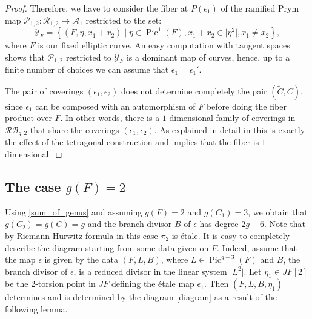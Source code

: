 \documentclass[preprint,12pt]{amsart}
\def\cA{\ensuremath{\mathcal{A}}}
\def\cP{\ensuremath{\mathcal{P}}}
\def\cR{\ensuremath{\mathcal{R}}}
\def\cY{\ensuremath{\mathcal{Y}}}
\def\tC{\ensuremath{\tilde{C}}}
\DeclareMathOperator{\Pic}{Pic}
\newcommand{\set}[1]{\left\{#1\right\}}
\theoremstyle{plain}
\theoremstyle{definition}
\begin{document}
\begin{proof}
Therefore, we have to consider the fiber at $P(\epsilon_1)$ of the ramified Prym map $\cP_{1,2}:\cR_{1,2}\rightarrow \cA_1$ restricted to the set: 
\[\cY_F=\set{(F,\eta, x_1+x_2) \mid \eta \in \Pic^1(F), x_1+x_2 \in \vert \eta^2 \vert, x_1 \neq x_2 },\]
where $F$ is our fixed elliptic curve.
An easy computation with tangent spaces shows that $\cP_{1,2}$ restricted to $\cY_F$ is a dominant map of curves, hence, up to a finite number of choices we can assume that $\epsilon _1=\epsilon_1'$.

The pair of coverings $(\epsilon_1,\epsilon_2)$ does not determine completely the pair $(\tC,C)$, since $\epsilon_1$ can be composed with an automorphism of $F$ before doing the fiber product over $F$.
In other words, there is a $1$-dimensional family of coverings in $\mathcal {RB}_{g,2}$ that share the coverings $(\epsilon_1,\epsilon_2)$. As explained in detail in \cite[Subsection~(2.10)]{N} this is exactly the effect of the tetragonal construction and implies that the fiber is $1$-dimensional.
\end{proof}




\subsection{The case \texorpdfstring{$g(F)=2$}{g(F)=2}}\label{sec:g=2}
Using \eqref{sum_of_genus} and assuming $g(F)=2$ and $g(C_1)=3$, we obtain that $g(C_2)=g(C)=g$ and the branch divisor $B$ of $\epsilon$ has degree $2g-6$.
Note that by Riemann Hurwitz formula in this case $\pi_2$ is \'etale.
It is easy to completely describe the diagram starting from some data given on $F$.
Indeed, assume that the map $\epsilon$ is given by the data $(F,L,B)$, where $L\in \Pic^{g-3}(F)$ and $B$, the branch divisor of $\epsilon$, is a reduced divisor in the linear system $\vert L^2 \vert$.
Let $\eta_1\in JF[2]$ be the 2-torsion point in $JF$ defining the étale map $\epsilon_1$.
Then $(F,L,B,\eta_1)$ determines and is determined by the diagram \eqref{diagram} as a result of the following lemma.
\end{document}
